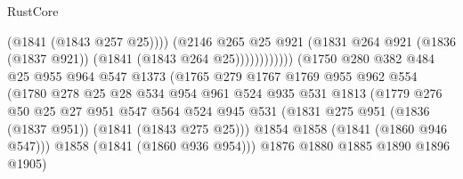 \begin{lexlean}{RustCore}
\begin{coremodule}
                                                (@1841 (@1843 @257 @25))))
                                            (@2146
                                              @265
                                              @25
                                              @921
                                              (@1831
                                                @264
                                                @921
                                                (@1836 (@1837 @921))
                                                (@1841 (@1843 @264 @25))))))))))))
                            (@1750
                              @280
                              @382
                              @484
                              @25
                              @955
                              @964
                              @547
                              @1373
                              (@1765
                                @279
                                @1767
                                @1769
                                @955
                                @962
                                @554
                                (@1780
                                  @278
                                  @25
                                  @28
                                  @534
                                  @954
                                  @961
                                  @524
                                  @935
                                  @531
                                  @1813
                                  (@1779
                                    @276
                                    @50
                                    @25
                                    @27
                                    @951
                                    @547
                                    @564
                                    @524
                                    @945
                                    @531
                                    (@1831 @275 @951 (@1836 (@1837 @951)) (@1841 (@1843 @275 @25)))
                                    @1854
                                    @1858
                                    (@1841 (@1860 @946 @547)))
                                  @1858
                                  (@1841 (@1860 @936 @954)))
                                @1876
                                @1880
                                @1885
                                @1890
                                @1896
                                @1905)

\end{coremodule}
\end{lexlean}
